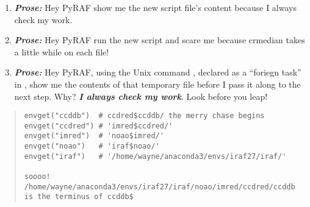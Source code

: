 \begin{enumerate}[resume]
   \item  \textbf{\emph{Prose:}} Hey PyRAF show me the new script file's content because I always check my work.
   \item  \textbf{\emph{Prose:}} Hey PyRAF run the new script and scare me because crmedian takes a little while on each file!
   \item \textbf{\emph{Prose:}} Hey PyRAF, using the Unix command {\color{verbcolor}{\verb#cat#}},
declared as a ``foriegn task'' in {\color{verbcolor}{\verb#~/iraf/login.cl#}}, show me the
contents of that temporary file before I pass it along to the next step. Why?
\textbf{\emph{ I always check my work}}. Look before you leap!
\end{enumerate}

{\color{verbcolor}
\begin{quote}
\begingroup \fontsize{10pt}{10pt}
\selectfont
\begin{verbatim}
envget("ccddb")  # ccdred$ccddb/ the merry chase begins
envget("ccdred") # 'imred$ccdred/'
envget("imred")  # 'noao$imred/'
envget("noao")   # 'iraf$noao/'
envget("iraf")   # '/home/wayne/anaconda3/envs/iraf27/iraf/'

soooo! /home/wayne/anaconda3/envs/iraf27/iraf/noao/imred/ccdred/ccddb
is the terminus of ccddb$
\end{verbatim}
\endgroup
\end{quote}
}
